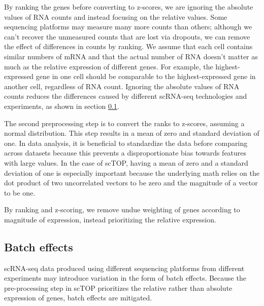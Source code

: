 \documentclass[aps,superscriptaddress, notitlepage,longbibliography]{revtex4-1}
\begin{document}
By ranking the genes before converting to z-scores, we are ignoring the absolute values of RNA counts and instead focusing on the relative values. Some sequencing platforms may measure many more counts than others; although we can't recover the unmeasured counts that are lost via dropouts, we can remove the effect of differences in counts by ranking. We assume that each cell contains similar numbers of mRNA and that the actual number of RNA doesn't matter as much as the relative expression of different genes. For example, the highest-expressed gene in one cell should be comparable to the highest-expressed gene in another cell, regardless of RNA count. Ignoring the absolute values of RNA counts reduces the differences caused by different scRNA-seq technologies and experiments, as shown in section \ref{batch effects section}.

The second preprocessing step is to convert the ranks to z-scores, assuming a normal distribution. This step results in a mean of zero and standard deviation of one. In data analysis, it is beneficial to standardize the data before comparing across datasets because this prevents a disproportionate bias towards features with large values. In the case of scTOP, having a mean of zero and a standard deviation of one is especially important because the underlying math relies on the dot product of two uncorrelated vectors to be zero and the magnitude of a vector to be one.

By ranking and z-scoring, we remove undue weighting of genes according to magnitude of expression, instead prioritizing the relative expression.

\subsection{Batch effects} \label{batch effects section}
scRNA-seq data produced using different sequencing platforms from different experiments may introduce variation in the form of batch effects. Because the pre-processing step in scTOP prioritizes the relative rather than absolute expression of genes, batch effects are mitigated.
\end{document}
